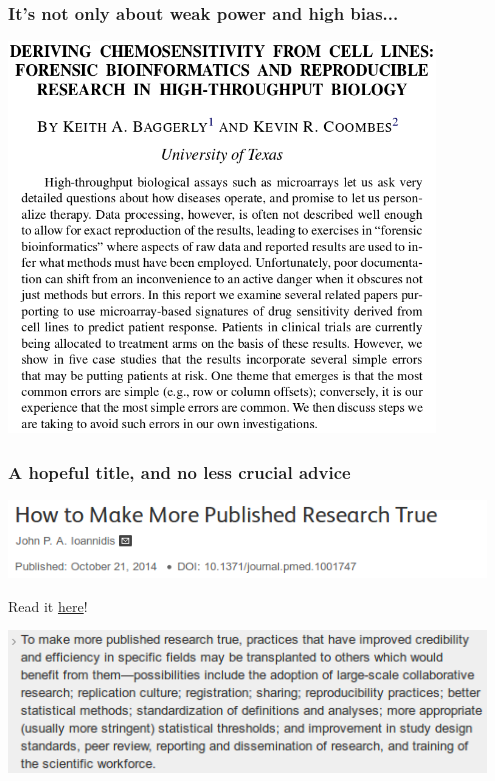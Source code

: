 \documentclass[c]{beamer} %
\begin{document}
\begin{frame}
  \frametitle{It's not only about weak power and high bias...}
  \begin{center}
    \includegraphics[width=0.85\textwidth,height=0.80\textheight,keepaspectratio=true]{baggerly_09_forensic-bioinfo_title-abstract}%
  \end{center}
\end{frame}

\begin{frame}
  \frametitle{A hopeful title, and no less crucial advice}
  \begin{center}
    \includegraphics[width=0.95\textwidth,height=0.90\textheight,keepaspectratio=true]{2014-10_JIoannidis_title}%
  \end{center}

  Read it \href{http://dx.doi.org/10.1371/journal.pmed.1001747}{here}!
  
  \bigskip
  
  \begin{center}
    \includegraphics[width=0.95\textwidth,height=0.90\textheight,keepaspectratio=true]{2014-10_JIoannidis_summary-point}%
  \end{center}
\end{frame}
\end{document}
